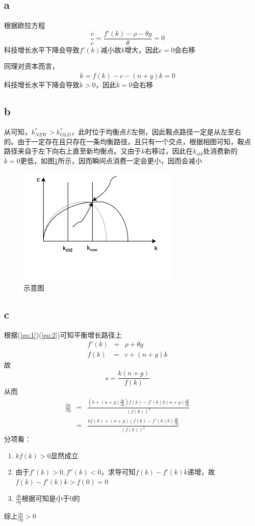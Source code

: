 \documentclass[a4paper,12pt]{ctexart}
\begin{document}
\subsection*{a}\label{sec:1}
根据欧拉方程
\begin{equation}
    \frac{\dot c}{c}=\frac{f'(k)-\rho-\theta g}{\theta}=0\label{eq:1}
\end{equation}
科技增长水平下降会导致$f'(k)$减小故$k$增大，因此$\dot c=0$会右移

同理对资本而言，
\begin{equation}
    \dot k=f(k)-c-(n+g)k=0\label{eq:2}
\end{equation}
科技增长水平下降会导致$\displaystyle \dot k>0$，因此$\dot k=0$会右移
\subsection*{b}
从可知，$k_{NEW}^*>k_{OLD}^*$，此时位于均衡点$E$左侧，因此鞍点路径一定是从左至右的。由于一定存在且只存在一条均衡路径，且只有一个交点，根据相图可知，鞍点路径来自于左下向右上直至新均衡点。又由于$\dot k$右移过，因此在$k_{old}$处消费新的$\dot k=0$更低，如图\ref{fig:1}所示，因而瞬间点消费一定会更小，因而会减小
\begin{figure}[H]
    \centering
    \includegraphics[trim=0 60 0 0,width=0.5\linewidth]{fig/fuck.drawio.png}
    \caption{示意图}\label{fig:1}
\end{figure}
\subsection*{c}
根据(\ref{eq:1})(\ref{eq:2})可知平衡增长路径上
\begin{eqnarray}
    f'(k)&=&\rho+\theta g \label{eq:4}\\
    f(k)&=&c+(n+g)k\label{eq:5}
\end{eqnarray}
故$$s=\frac{k(n+g)}{f(k)}$$
从而
\begin{eqnarray}
    \frac{\partial s}{\partial g}&=&\frac{(k+(n+g)\frac{\partial k}{\partial g})f(k)-f'(k)k(n+g)\frac{\partial k}{\partial g}}{(f(k))^2}\nonumber\\
    &=&\frac{kf(k)+(n+g)(f(k)-f'(k)k)\frac{\partial k}{\partial g}}{(f(k))^2}\label{eq:3}
\end{eqnarray}
分项看：
\begin{enumerate}
    \item $kf(k)>0$显然成立
    \item 由于$f'(k)>0,f''(k)<0$，求导可知$f(k)-f'(k)k$递增，故$f(k)-f'(k)k>f(0)=0$
    \item $\frac{\partial k}{\partial g}$根据可知是小于0的
\end{enumerate}
综上$\frac{\partial s}{\partial g}>0$
\end{document}
